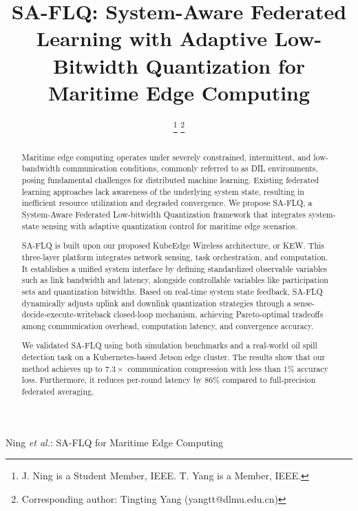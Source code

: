 \documentclass[journal]{IEEEtran}
\begin{document}
\title{SA-FLQ: System-Aware Federated Learning with Adaptive Low-Bitwidth Quantization for Maritime Edge Computing}

\author{
    \thanks{J. Ning is a Student Member, IEEE. T. Yang is a Member, IEEE.}
    \thanks{Corresponding author: Tingting Yang (yangtt@dlmu.edu.cn)}
}

%
{Ning \MakeLowercase{\textit{et al.}}: SA-FLQ for Maritime Edge Computing}

\maketitle

\begin{abstract}
Maritime edge computing operates under severely constrained, intermittent, and low-bandwidth communication conditions, commonly referred to as DIL environments, posing fundamental challenges for distributed machine learning. Existing federated learning approaches lack awareness of the underlying system state, resulting in inefficient resource utilization and degraded convergence. We propose SA-FLQ, a System-Aware Federated Low-bitwidth Quantization framework that integrates system-state sensing with adaptive quantization control for maritime edge scenarios.

SA-FLQ is built upon our proposed KubeEdge Wireless architecture, or KEW. This three-layer platform integrates network sensing, task orchestration, and computation. It establishes a unified system interface by defining standardized observable variables such as link bandwidth and latency, alongside controllable variables like participation sets and quantization bitwidths. Based on real-time system state feedback, SA-FLQ dynamically adjusts uplink and downlink quantization strategies through a sense-decide-execute-writeback closed-loop mechanism, achieving Pareto-optimal tradeoffs among communication overhead, computation latency, and convergence accuracy.

We validated SA-FLQ using both simulation benchmarks and a real-world oil spill detection task on a Kubernetes-based Jetson edge cluster. The results show that our method achieves up to $7.3\times$ communication compression with less than $1\%$ accuracy loss. Furthermore, it reduces per-round latency by $86\%$ compared to full-precision federated averaging.
\end{abstract}
\end{document}
